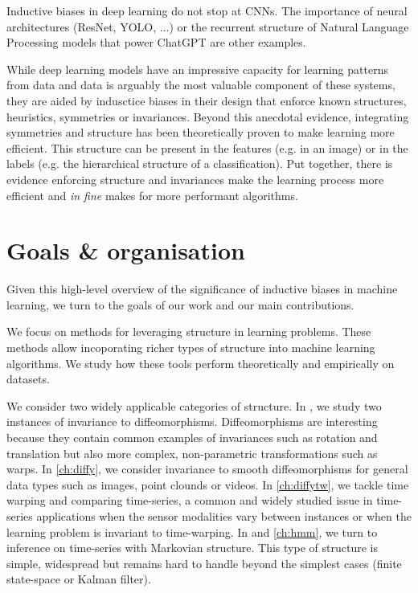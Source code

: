 Inductive biases in deep learning do not stop at CNNs. The importance of neural architectures (ResNet, YOLO, ...) or the recurrent structure of Natural Language Processing models that power ChatGPT are other examples.

While deep learning models have an impressive capacity for learning patterns from data and data is arguably the most valuable component of these systems, they are aided by indusctice biases in their design that enforce known structures, heuristics, symmetries or invariances. Beyond this anecdotal evidence, integrating symmetries and structure has been theoretically proven to make learning more efficient. This structure can be present in the features (e.g. in an image) or in the labels (e.g. the hierarchical structure of a classification). Put together, there is evidence enforcing structure and invariances make the learning process more efficient and \emph{in fine} makes for more performant algorithms.

\section{Goals \& organisation}
Given this high-level overview of the significance of inductive biases in machine learning, we turn to the goals of our work and our main contributions.

We focus on methods for leveraging structure in learning problems. These methods allow incoporating richer types of structure into machine learning algorithms. We study how these tools perform theoretically and empirically on datasets.

We consider two widely applicable categories of structure. In , we study two instances of invariance to diffeomorphisms. Diffeomorphisms are interesting because they contain common examples of invariances such as rotation and translation but also more complex, non-parametric transformations such as warps. In \cref{ch:diffy}, we consider invariance to smooth diffeomorphisms for general data types such as images, point clounds or videos. In \cref{ch:diffytw}, we tackle time warping and comparing time-series, a common and widely studied issue in time-series applications when the sensor modalities vary between instances or when the learning problem is invariant to time-warping. In  and \cref{ch:hmm}, we turn to inference on time-series with Markovian structure. This type of structure is simple, widespread but remains hard to handle beyond the simplest cases (finite state-space or Kalman filter).


